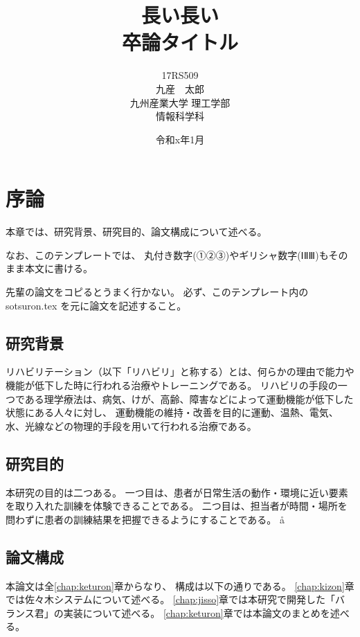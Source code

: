 \documentclass[uplatex,a4paper,12pt]{jsreport}
\title{
 \Huge{長い長い}\\
 \Huge{卒論タイトル}
 \vspace{3.5cm}\\
}
\author{\LARGE{17RS509}\vspace{0.5cm}\\
\LARGE{九産　太郎}\vspace{2cm}\\
\LARGE{九州産業大学 理工学部}\vspace{0.5cm}\\
\LARGE{情報科学科}\vspace{1cm}\\
}
\date{\LARGE{令和x年1月}}
\begin{document}
\maketitle
\setcounter{page}{0}
\tableofcontents
\listoffigures
\listoftables
\clearpage
\setcounter{page}{0}


\chapter{序論}\label{chap:joron}
本章では、研究背景、研究目的、論文構成について述べる。

なお、このテンプレートでは、
丸付き数字(①②③)やギリシャ数字(ⅠⅡⅢ)もそのまま本文に書ける。

先輩の論文をコピるとうまく行かない。
必ず、このテンプレート内の sotsuron.tex を元に論文を記述すること。

\section{研究背景}\label{sec:haikei}

リハビリテーション（以下「リハビリ」と称する）とは、何らかの理由で能力や機能が低下した時に行われる治療やトレーニングである。
リハビリの手段の一つである理学療法は、病気、けが、高齢、障害などによって運動機能が低下した状態にある人々に対し、
運動機能の維持・改善を目的に運動、温熱、電気、水、光線などの物理的手段を用いて行われる治療である\cite{igaku}。
  
    
\section{研究目的}\label{sec:mokuteki}

本研究の目的は二つある。
一つ目は、患者が日常生活の動作・環境に近い要素を取り入れた訓練を体験できることである。
二つ目は、担当者が時間・場所を問わずに患者の訓練結果を把握できるようにすることである。
å
  
\section{論文構成}\label{sec:kousei}

本論文は全\ref{chap:keturon}章からなり、
構成は以下の通りである。
\ref{chap:kizon}章では佐々木システムについて述べる。
\ref{chap:jisso}章では本研究で開発した「バランス君」の実装について述べる。
\ref{chap:keturon}章では本論文のまとめを述べる。
\end{document}
